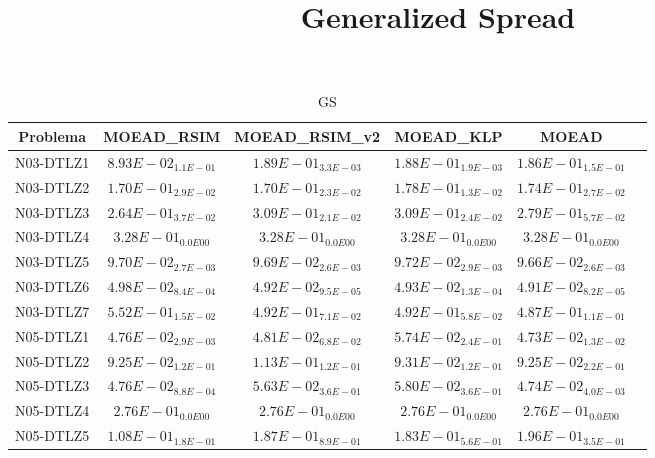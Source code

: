 \documentclass{article}
\title{Generalized Spread}
\author{}
\begin{document}
\maketitle
\begin{table*}[ht!]
\scriptsize
\caption{GS}
\centering\begin{tabular}{|c||c||c||c||c||c|} \hline
Problema &MOEAD_RSIM &MOEAD_RSIM_v2 &MOEAD_KLP &MOEAD\\\hline
N03-DTLZ1 &\cellcolor{gray95}$8.93E-02_{1.1E-01}$ &$1.89E-01_{3.3E-03}$ &$1.88E-01_{1.9E-03}$ &\cellcolor{gray25}$1.86E-01_{1.5E-01}$\\ 
\hline
N03-DTLZ2 &\cellcolor{gray95}$1.70E-01_{2.9E-02}$ &\cellcolor{gray25}$1.70E-01_{2.3E-02}$ &$1.78E-01_{1.3E-02}$ &$1.74E-01_{2.7E-02}$\\ 
\hline
N03-DTLZ3 &\cellcolor{gray95}$2.64E-01_{3.7E-02}$ &$3.09E-01_{2.1E-02}$ &$3.09E-01_{2.4E-02}$ &\cellcolor{gray25}$2.79E-01_{5.7E-02}$\\ 
\hline
N03-DTLZ4 &\cellcolor{gray95}$3.28E-01_{0.0E00}$ &\cellcolor{gray25}$3.28E-01_{0.0E00}$ &$3.28E-01_{0.0E00}$ &$3.28E-01_{0.0E00}$\\ 
\hline
N03-DTLZ5 &$9.70E-02_{2.7E-03}$ &\cellcolor{gray25}$9.69E-02_{2.6E-03}$ &$9.72E-02_{2.9E-03}$ &\cellcolor{gray95}$9.66E-02_{2.6E-03}$\\ 
\hline
N03-DTLZ6 &$4.98E-02_{8.4E-04}$ &\cellcolor{gray25}$4.92E-02_{9.5E-05}$ &$4.93E-02_{1.3E-04}$ &\cellcolor{gray95}$4.91E-02_{8.2E-05}$\\ 
\hline
N03-DTLZ7 &$5.52E-01_{1.5E-02}$ &$4.92E-01_{7.1E-02}$ &\cellcolor{gray25}$4.92E-01_{5.8E-02}$ &\cellcolor{gray95}$4.87E-01_{1.1E-01}$\\ 
\hline
N05-DTLZ1 &\cellcolor{gray25}$4.76E-02_{2.9E-03}$ &$4.81E-02_{6.8E-02}$ &$5.74E-02_{2.4E-01}$ &\cellcolor{gray95}$4.73E-02_{1.3E-02}$\\ 
\hline
N05-DTLZ2 &\cellcolor{gray95}$9.25E-02_{1.2E-01}$ &$1.13E-01_{1.2E-01}$ &$9.31E-02_{1.2E-01}$ &\cellcolor{gray25}$9.25E-02_{2.2E-01}$\\ 
\hline
N05-DTLZ3 &\cellcolor{gray25}$4.76E-02_{8.8E-04}$ &$5.63E-02_{3.6E-01}$ &$5.80E-02_{3.6E-01}$ &\cellcolor{gray95}$4.74E-02_{4.0E-03}$\\ 
\hline
N05-DTLZ4 &\cellcolor{gray95}$2.76E-01_{0.0E00}$ &\cellcolor{gray25}$2.76E-01_{0.0E00}$ &$2.76E-01_{0.0E00}$ &$2.76E-01_{0.0E00}$\\ 
\hline
N05-DTLZ5 &\cellcolor{gray95}$1.08E-01_{1.8E-01}$ &$1.87E-01_{8.9E-01}$ &\cellcolor{gray25}$1.83E-01_{5.6E-01}$ &$1.96E-01_{3.5E-01}$\\ 

\end{tabular}
\end{table*}
\end{document}
